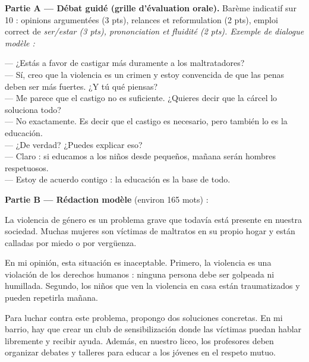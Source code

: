 \documentclass[11pt]{article}
\newcommand{\esp}[1]{\ifmmode\text{\textit{#1}}\else\begingroup\selectlanguage{spanish}\itshape #1\endgroup\fi}
\begin{document}
\begin{corrige}
\textbf{Partie A — Débat guidé (grille d'évaluation orale).} Barème indicatif sur 10 : opinions argumentées (3 pts), relances et reformulation (2 pts), emploi correct de \esp{ser}/\esp{estar} (3 pts), prononciation et fluidité (2 pts).
Exemple de dialogue modèle :
\begin{textebox}
--- ¿Estás a favor de castigar más duramente a los maltratadores?\\
--- Sí, creo que la violencia es un crimen y estoy convencida de que las penas deben ser más fuertes. ¿Y tú qué piensas?\\
--- Me parece que el castigo no es suficiente. ¿Quieres decir que la cárcel lo soluciona todo?\\
--- No exactamente. Es decir que el castigo es necesario, pero también lo es la educación.\\
--- ¿De verdad? ¿Puedes explicar eso?\\
--- Claro : si educamos a los niños desde pequeños, mañana serán hombres respetuosos.\\
--- Estoy de acuerdo contigo : la educación es la base de todo.
\end{textebox}
\textbf{Partie B — Rédaction modèle} (environ 165 mots) :
\begin{textebox}
La violencia de género es un problema grave que todavía está presente en nuestra sociedad. Muchas mujeres son víctimas de maltratos en su propio hogar y están calladas por miedo o por vergüenza.

En mi opinión, esta situación es inaceptable. Primero, la violencia es una violación de los derechos humanos : ninguna persona debe ser golpeada ni humillada. Segundo, los niños que ven la violencia en casa están traumatizados y pueden repetirla mañana.

Para luchar contra este problema, propongo dos soluciones concretas. En mi barrio, hay que crear un club de sensibilización donde las víctimas puedan hablar libremente y recibir ayuda. Además, en nuestro liceo, los profesores deben organizar debates y talleres para educar a los jóvenes en el respeto mutuo.


\end{textebox}
\end{corrige}
\end{document}
